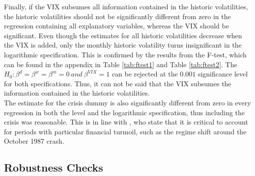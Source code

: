Finally, if the VIX subsumes all information contained in the historic volatilities, the historic volatilities should not be significantly different from zero in the regression containing all explanatory variables, whereas the VIX should be significant. Even though the estimates for all historic volatilities decrease when the VIX is added, only the monthly historic volatility turns insignificant in the logarithmic specification. This is confirmed by the results from the F-test, which can be found in the appendix in Table \ref{tab:ftest1} and Table \ref{tab:ftest2}. The $H_{0}: \beta^{d} = \beta^{w} = \beta^{m} = 0 \ and \ \beta^{VIX} = 1$ can be rejected at the $0.001$ significance level for both specifications. Thus, it can not be said that the VIX subsumes the information contained in the historic volatilities.\\
The estimate for the crisis dummy is also significantly different from zero in every regression in both the level and the logarithmic specification, thus including the crisis was reasonable. This is in line with \textcite{jiang2003}, who state that it is critical to account for periods with particular financial turmoil, such as the regime shift  around the October 1987 crash.

%


\subsection{Robustness Checks}\label{sec51Robustness}


